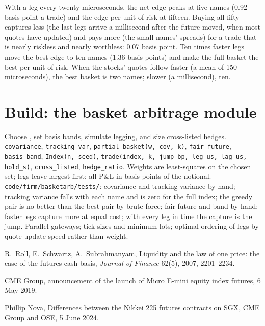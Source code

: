 With a leg every twenty microseconds, the net edge peaks at five names (0.92 basis point a trade) and the edge per unit of risk at fifteen. Buying
all fifty captures less (the last legs arrive a millisecond after the future moved, when most quotes have updated) and pays more (the small names'
spreads) for a trade that is nearly riskless and nearly worthless: 0.07 basis point. Ten times faster legs move the best edge to ten names (1.36
basis points) and make the full basket the best per unit of risk. When the stocks' quotes follow faster (a mean of 150 microseconds), the best basket
is two names; slower (a millisecond), ten.

\section{Build: the basket arbitrage module}\label{bld:hf:index-and-basket-arbitrage:basketarb}

\begin{build}
 Choose , set basis bands, simulate legging, and size cross-listed hedges.
 \texttt{covariance}, \texttt{tracking\_var}, \texttt{partial\_basket(w, cov, k)}, \texttt{fair\_future}, \texttt{basis\_band},
\texttt{Index(n, seed)}, \texttt{trade(index, k, jump\_bp, leg\_us, lag\_us, hold\_s)}, \texttt{cross\_listed}, \texttt{hedge\_ratio}.
 Weights are least-squares on the chosen set; legs leave largest first; all P\&L in basis points of the notional.
 \texttt{code/firm/basketarb/tests/}: covariance and tracking variance by hand; tracking variance falls with each name and
is zero for the full index; the greedy pair is no better than the best pair by brute force; fair future and band by hand; faster legs capture more at
equal cost; with every leg in time the capture is the jump.
 Parallel gateways; tick sizes and minimum lots; optimal ordering of legs by quote-update speed rather than weight.
\end{build}

\begin{omsources}
\item R.~Roll, E.~Schwartz, A.~Subrahmanyam, Liquidity and the law of one price: the case of the futures-cash basis, \emph{Journal of Finance}
62(5), 2007, 2201--2234.
\item CME Group, announcement of the launch of Micro E-mini equity index futures, 6 May 2019.
\item Phillip Nova, Differences between the Nikkei 225 futures contracts on SGX, CME Group and OSE, 5 June 2024.
\end{omsources}


